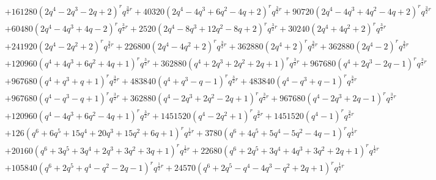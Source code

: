 \documentclass[11pt,english]{amsart}
\numberwithin{equation}{section}
\numberwithin{figure}{section}
\theoremstyle{plain}
\theoremstyle{plain}
\theoremstyle{definition}
\theoremstyle{remark}
\begin{document}
{\begin{align*}
& + 161280 {\left(2 q^{4} - 2 q^{3} - 2 q + 2\right)}^{r} q^{\frac{3}{2} r} + 40320 {\left(2 q^{4} - 4 q^{3} + 6 q^{2} - 4 q + 2\right)}^{r} q^{\frac{3}{2} r} + 90720 {\left(2 q^{4} - 4 q^{3} + 4 q^{2} - 4 q + 2\right)}^{r} q^{\frac{3}{2} r} \\
& + 60480 {\left(2 q^{4} - 4 q^{3} + 4 q - 2\right)}^{r} q^{\frac{3}{2} r} + 2520 {\left(2 q^{4} - 8 q^{3} + 12 q^{2} - 8 q + 2\right)}^{r} q^{\frac{3}{2} r} + 30240 {\left(2 q^{4} + 4 q^{2} + 2\right)}^{r} q^{\frac{3}{2} r} \\
& + 241920 {\left(2 q^{4} - 2 q^{2} + 2\right)}^{r} q^{\frac{3}{2} r} + 226800 {\left(2 q^{4} - 4 q^{2} + 2\right)}^{r} q^{\frac{3}{2} r} + 362880 {\left(2 q^{4} + 2\right)}^{r} q^{\frac{3}{2} r} + 362880 {\left(2 q^{4} - 2\right)}^{r} q^{\frac{3}{2} r} \\
& + 120960 {\left(q^{4} + 4 q^{3} + 6 q^{2} + 4 q + 1\right)}^{r} q^{\frac{3}{2} r} + 362880 {\left(q^{4} + 2 q^{3} + 2 q^{2} + 2 q + 1\right)}^{r} q^{\frac{3}{2} r} + 967680 {\left(q^{4} + 2 q^{3} - 2 q - 1\right)}^{r} q^{\frac{3}{2} r} \\
& + 967680 {\left(q^{4} + q^{3} + q + 1\right)}^{r} q^{\frac{3}{2} r} + 483840 {\left(q^{4} + q^{3} - q - 1\right)}^{r} q^{\frac{3}{2} r} + 483840 {\left(q^{4} - q^{3} + q - 1\right)}^{r} q^{\frac{3}{2} r} \\
& + 967680 {\left(q^{4} - q^{3} - q + 1\right)}^{r} q^{\frac{3}{2} r} + 362880 {\left(q^{4} - 2 q^{3} + 2 q^{2} - 2 q + 1\right)}^{r} q^{\frac{3}{2} r} + 967680 {\left(q^{4} - 2 q^{3} + 2 q - 1\right)}^{r} q^{\frac{3}{2} r} \\
& + 120960 {\left(q^{4} - 4 q^{3} + 6 q^{2} - 4 q + 1\right)}^{r} q^{\frac{3}{2} r} + 1451520 {\left(q^{4} - 2 q^{2} + 1\right)}^{r} q^{\frac{3}{2} r} + 1451520 {\left(q^{4} - 1\right)}^{r} q^{\frac{3}{2} r} \\
& + 126 {\left(q^{6} + 6 q^{5} + 15 q^{4} + 20 q^{3} + 15 q^{2} + 6 q + 1\right)}^{r} q^{\frac{1}{2} r} + 3780 {\left(q^{6} + 4 q^{5} + 5 q^{4} - 5 q^{2} - 4 q - 1\right)}^{r} q^{\frac{1}{2} r} \\
& + 20160 {\left(q^{6} + 3 q^{5} + 3 q^{4} + 2 q^{3} + 3 q^{2} + 3 q + 1\right)}^{r} q^{\frac{1}{2} r} + 22680 {\left(q^{6} + 2 q^{5} + 3 q^{4} + 4 q^{3} + 3 q^{2} + 2 q + 1\right)}^{r} q^{\frac{1}{2} r} \\
& + 105840 {\left(q^{6} + 2 q^{5} + q^{4} - q^{2} - 2 q - 1\right)}^{r} q^{\frac{1}{2} r} + 24570 {\left(q^{6} + 2 q^{5} - q^{4} - 4 q^{3} - q^{2} + 2 q + 1\right)}^{r} q^{\frac{1}{2} r} \\

\end{align*}}
\end{document}
